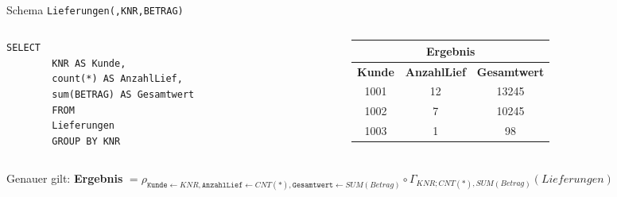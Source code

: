 \begin{frame}[fragile]\frametitle{\insertsection}
\framesubtitle{\insertsubsection}
\onslide 
{}\\[4pt]
Schema \texttt{Lieferungen(,KNR,BETRAG)}
\begin{columns}
	\begin{column}{.48\textwidth}
		\begin{lstlisting}[xleftmargin=3ex]
		SELECT
		KNR AS Kunde,
		count(*) AS AnzahlLief,
		sum(BETRAG) AS Gesamtwert
		FROM
		Lieferungen
		GROUP BY KNR
		\end{lstlisting}
	\end{column}
	\begin{column}{.48\textwidth}
		\begin{center}
			\begin{tabular}{|c|c|c|}\hline
				\multicolumn{3}{|c|}{\footnotesize \textbf{Ergebnis}}\\\hline\hline
				\footnotesize{\textbf{Kunde}} &\footnotesize{\textbf{AnzahlLief}} &\footnotesize{\textbf{Gesamtwert}}  \\\hline
				\footnotesize 1001 &\footnotesize 12& \footnotesize 13245 \\\hline
				\footnotesize 1002 &\footnotesize 7& \footnotesize 10245 \\\hline
				\footnotesize 1003 &\footnotesize 1&\footnotesize  98 \\\hline
			\end{tabular}
		\end{center}
	\end{column}
\end{columns}
\pause
\abs 
Genauer gilt:\nl
\textbf{Ergebnis} $=\rho_{\texttt{Kunde}\leftarrow KNR, \texttt{AnzahlLief}\leftarrow CNT(*),
	\texttt{Gesamtwert}\leftarrow SUM(Betrag)}\circ 
\Gamma_{KNR;CNT(*),SUM(Betrag)}(Lieferungen)$
\end{frame}

